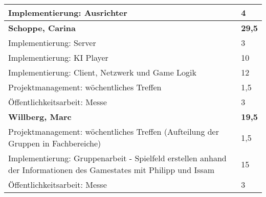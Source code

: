 \documentclass[a4paper,11pt]{scrartcl}
\begin{document}
\begin{longtable}{| p{13.8cm} | C{2.4cm} |}
  Implementierung: Ausrichter
	&
  4
	\\
	\hline
	\hline


	\textbf{Schoppe, Carina} & \textbf{29,5}\\ %
	\hline

  Implementierung: Server
	&
  3
	\\
	\hline

  Implementierung: KI Player
	&
  10
	\\
	\hline

  Implementierung: Client, Netzwerk und Game Logik
	&
  12
	\\
	\hline

  Projektmanagement: wöchentliches Treffen
	&
  1,5
	\\
	\hline
	
  Öffentlichkeitsarbeit: Messe
	&
  3
	\\
	\hline
	\hline


	\textbf{Willberg, Marc} & \textbf{19,5}\\ %
	\hline

  Projektmanagement: wöchentliches Treffen (Aufteilung der Gruppen in Fachbereiche)
	&
  1,5
	\\
	\hline

  Implementierung: Gruppenarbeit - Spielfeld erstellen anhand der Informationen des Gamestates mit Philipp und Issam
	&
  15
	\\
	\hline
	
  Öffentlichkeitsarbeit: Messe
	&
  3
	\\
	\hline

\end{longtable}
\end{document}
